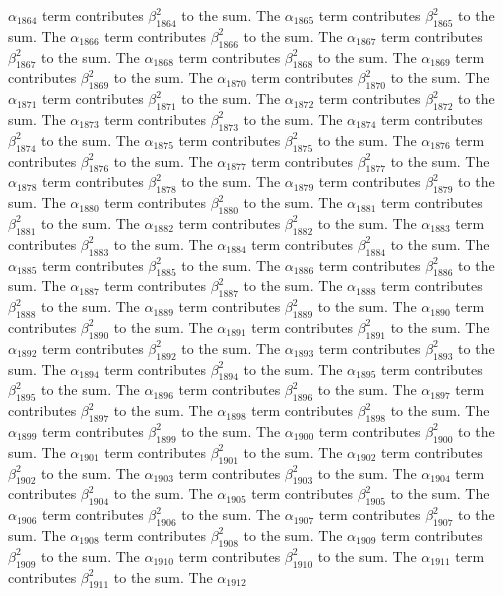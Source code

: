 \begin{lemma}
$\alpha_{1864}$ term contributes $\beta_{1864}^{2}$ to the sum. The $\alpha_{1865}$ term contributes $\beta_{1865}^{2}$ to the sum. The $\alpha_{1866}$ term contributes $\beta_{1866}^{2}$ to the sum. The $\alpha_{1867}$ term contributes $\beta_{1867}^{2}$ to the sum. The $\alpha_{1868}$ term contributes $\beta_{1868}^{2}$ to the sum. The $\alpha_{1869}$ term contributes $\beta_{1869}^{2}$ to the sum. The $\alpha_{1870}$ term contributes $\beta_{1870}^{2}$ to the sum. The $\alpha_{1871}$ term contributes $\beta_{1871}^{2}$ to the sum. The $\alpha_{1872}$ term contributes $\beta_{1872}^{2}$ to the sum. The $\alpha_{1873}$ term contributes $\beta_{1873}^{2}$ to the sum. The $\alpha_{1874}$ term contributes $\beta_{1874}^{2}$ to the sum. The $\alpha_{1875}$ term contributes $\beta_{1875}^{2}$ to the sum. The $\alpha_{1876}$ term contributes $\beta_{1876}^{2}$ to the sum. The $\alpha_{1877}$ term contributes $\beta_{1877}^{2}$ to the sum. The $\alpha_{1878}$ term contributes $\beta_{1878}^{2}$ to the sum. The $\alpha_{1879}$ term contributes $\beta_{1879}^{2}$ to the sum. The $\alpha_{1880}$ term contributes $\beta_{1880}^{2}$ to the sum. The $\alpha_{1881}$ term contributes $\beta_{1881}^{2}$ to the sum. The $\alpha_{1882}$ term contributes $\beta_{1882}^{2}$ to the sum. The $\alpha_{1883}$ term contributes $\beta_{1883}^{2}$ to the sum. The $\alpha_{1884}$ term contributes $\beta_{1884}^{2}$ to the sum. The $\alpha_{1885}$ term contributes $\beta_{1885}^{2}$ to the sum. The $\alpha_{1886}$ term contributes $\beta_{1886}^{2}$ to the sum. The $\alpha_{1887}$ term contributes $\beta_{1887}^{2}$ to the sum. The $\alpha_{1888}$ term contributes $\beta_{1888}^{2}$ to the sum. The $\alpha_{1889}$ term contributes $\beta_{1889}^{2}$ to the sum. The $\alpha_{1890}$ term contributes $\beta_{1890}^{2}$ to the sum. The $\alpha_{1891}$ term contributes $\beta_{1891}^{2}$ to the sum. The $\alpha_{1892}$ term contributes $\beta_{1892}^{2}$ to the sum. The $\alpha_{1893}$ term contributes $\beta_{1893}^{2}$ to the sum. The $\alpha_{1894}$ term contributes $\beta_{1894}^{2}$ to the sum. The $\alpha_{1895}$ term contributes $\beta_{1895}^{2}$ to the sum. The $\alpha_{1896}$ term contributes $\beta_{1896}^{2}$ to the sum. The $\alpha_{1897}$ term contributes $\beta_{1897}^{2}$ to the sum. The $\alpha_{1898}$ term contributes $\beta_{1898}^{2}$ to the sum. The $\alpha_{1899}$ term contributes $\beta_{1899}^{2}$ to the sum. The $\alpha_{1900}$ term contributes $\beta_{1900}^{2}$ to the sum. The $\alpha_{1901}$ term contributes $\beta_{1901}^{2}$ to the sum. The $\alpha_{1902}$ term contributes $\beta_{1902}^{2}$ to the sum. The $\alpha_{1903}$ term contributes $\beta_{1903}^{2}$ to the sum. The $\alpha_{1904}$ term contributes $\beta_{1904}^{2}$ to the sum. The $\alpha_{1905}$ term contributes $\beta_{1905}^{2}$ to the sum. The $\alpha_{1906}$ term contributes $\beta_{1906}^{2}$ to the sum. The $\alpha_{1907}$ term contributes $\beta_{1907}^{2}$ to the sum. The $\alpha_{1908}$ term contributes $\beta_{1908}^{2}$ to the sum. The $\alpha_{1909}$ term contributes $\beta_{1909}^{2}$ to the sum. The $\alpha_{1910}$ term contributes $\beta_{1910}^{2}$ to the sum. The $\alpha_{1911}$ term contributes $\beta_{1911}^{2}$ to the sum. The $\alpha_{1912}$ 
\end{lemma}
